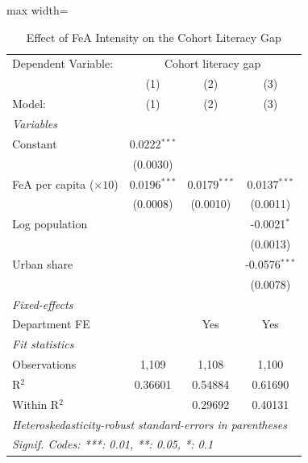 
\begin{table}[htbp]
   \caption{\label{tab:main} Effect of FeA Intensity on the Cohort Literacy Gap}
   \centering
   \begin{adjustbox}{max width=\textwidth}\begin{tabular}{lccc}
      \tabularnewline \midrule \midrule
      Dependent Variable: & \multicolumn{3}{c}{Cohort literacy gap}\\
                                    & (1)            & (2)            & (3) \\   
      Model:                        & (1)            & (2)            & (3)\\  
      \midrule
      \emph{Variables}\\
      Constant                      & 0.0222$^{***}$ &                &   \\   
                                    & (0.0030)       &                &   \\   
      FeA per capita ($\times 10$)  & 0.0196$^{***}$ & 0.0179$^{***}$ & 0.0137$^{***}$\\   
                                    & (0.0008)       & (0.0010)       & (0.0011)\\   
      Log population                &                &                & -0.0021$^{*}$\\   
                                    &                &                & (0.0013)\\   
      Urban share                   &                &                & -0.0576$^{***}$\\   
                                    &                &                & (0.0078)\\   
      \midrule
      \emph{Fixed-effects}\\
      Department FE                 &                & Yes            & Yes\\  
      \midrule
      \emph{Fit statistics}\\
      Observations                  & 1,109          & 1,108          & 1,100\\  
      R$^2$                         & 0.36601        & 0.54884        & 0.61690\\  
      Within R$^2$                  &                & 0.29692        & 0.40131\\  
      \midrule \midrule
      \multicolumn{4}{l}{\emph{Heteroskedasticity-robust standard-errors in parentheses}}\\
      \multicolumn{4}{l}{\emph{Signif. Codes: ***: 0.01, **: 0.05, *: 0.1}}\\
   \end{tabular}\end{adjustbox}
   

\end{table}
